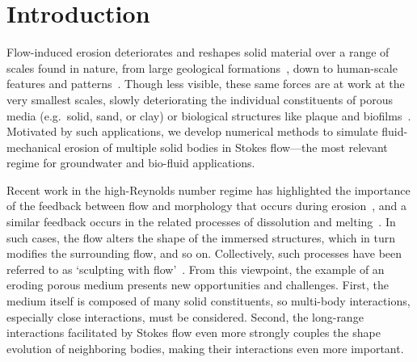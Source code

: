 \documentclass[preprint, 10pt]{elsarticle}
\begin{document}
\maketitle

\section{Introduction\label{s:intro}}
Flow-induced erosion deteriorates and reshapes solid material over a range of scales found in nature, from large geological formations~\cite{han1969, Rothman2012, coh-dev-sey-yi-szy-rot2015}, down to human-scale features and patterns~\cite{daerr2003erosion}. Though less visible, these same forces are at work at the very smallest scales, slowly deteriorating the individual constituents of porous media (e.g.~solid, sand, or clay) or biological structures like plaque and biofilms~\cite{pic-van-hei2000, sha2002, gro-gij-van-fer-hat-van-yua-wen2007}. Motivated by such applications, we develop numerical methods to simulate fluid-mechanical erosion of multiple solid bodies in Stokes flow---the most relevant regime for groundwater and bio-fluid applications.

Recent work in the high-Reynolds number regime has highlighted the importance
of the feedback between flow and morphology that occurs during erosion~\cite{ris-moo-chi-she-zha2012, moo-ris-chi-zha-she2013, hewett2017evolution, moore2017riemann}, and a similar feedback occurs in the related processes of dissolution and melting~\cite{Huang2015, kondratiuk2015steadily, rycroft2016asymmetric, cohen2016erosion, hewett2017pear, claudin2017dissolution}. In such cases, the flow alters the shape of the immersed structures, which in turn modifies the surrounding flow, and so on. Collectively, such processes have been referred to as `sculpting with flow'~\cite{ristroph2018sculpting}. From this viewpoint, the example of an eroding porous medium presents new opportunities and challenges. First, the medium itself is composed of many solid constituents, so multi-body interactions, especially close interactions, must be considered. Second, the long-range interactions facilitated by Stokes flow even more strongly couples the shape evolution of neighboring bodies, making their interactions even more important.
\end{document}
